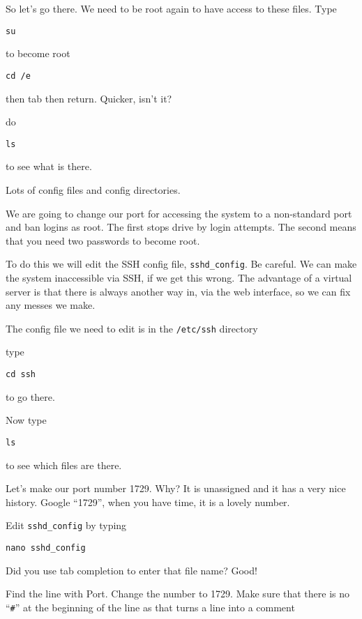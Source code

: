 \documentclass[12pt, a4paper]{article}
\begin{document}
So let's go there. We need to be root again to have access to these files. Type
\begin{verbatim}
su
\end{verbatim}
to become root
\begin{verbatim}
cd /e 
\end{verbatim}
then tab then return. Quicker, isn’t it?

do 

\begin{verbatim}
ls
\end{verbatim}

to see what is there. 

Lots of config files and config directories.

We are going to change our port for accessing the system to a non-standard port and ban logins as root. The first stops drive by login attempts. The second means that you need two passwords to become root.

To do this we will edit the SSH config file, \verb|sshd_config|. Be careful. We can make the system inaccessible via SSH, if we get this wrong. The advantage of a virtual server is that there is always another way in, via the web interface, so we can fix any messes we make.

The config file we need to edit is in the \verb|/etc/ssh| directory

type
\begin{verbatim}
cd ssh
\end{verbatim}

to go there.

Now type

\begin{verbatim}
ls
\end{verbatim}
 
to see which files are there.

Let’s make our port number 1729. Why? It is unassigned and it has a very nice history. Google “1729”, when you have time, it is a lovely number.

Edit \verb|sshd_config| by typing

\begin{verbatim}
nano sshd_config
\end{verbatim}

Did you use tab completion to enter that file name? Good!

Find the line with Port. Change the number to 1729. Make sure that there is no ``\verb|#|'' at the beginning of the line as that turns a line into a comment 
\end{document}
